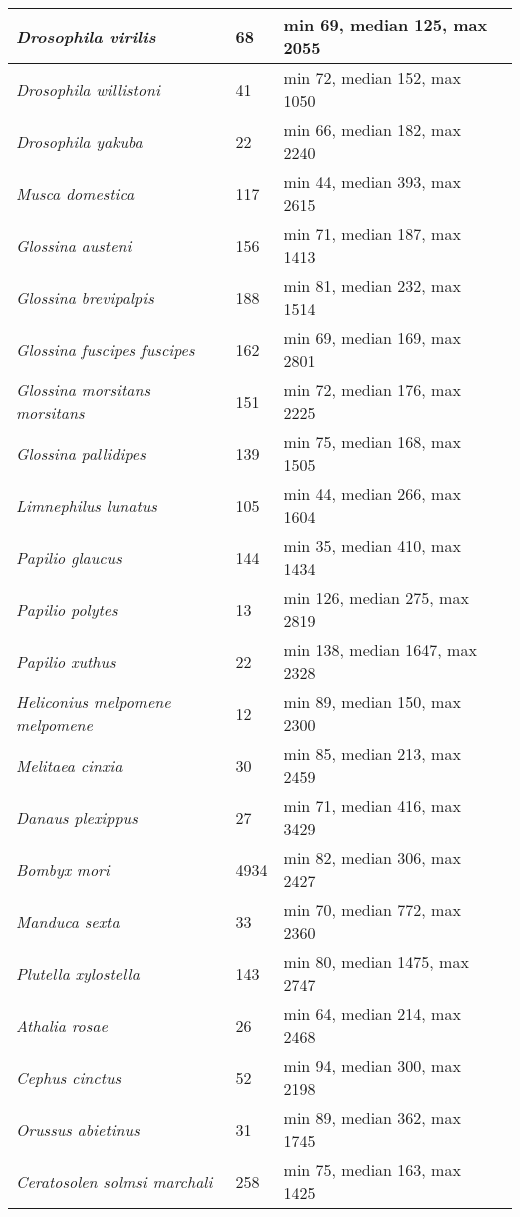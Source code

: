 {\begin{longtable}{| L{4cm} | L{2cm}  | L{5cm} | L{4cm} |}
\textit{Drosophila virilis} & 68 & min 69, median 125, max 2055 & \\ \hline
\textit{Drosophila willistoni} & 41 & min 72, median 152, max 1050 & \\ \hline
\textit{Drosophila yakuba} & 22 & min 66, median 182, max 2240 & \\ \hline
\textit{Musca domestica} & 117 & min 44, median 393, max 2615 & \\ \hline
\textit{Glossina austeni} & 156 & min 71, median 187, max 1413 & \\ \hline
\textit{Glossina brevipalpis} & 188 & min 81, median 232, max 1514 & \\ \hline
\textit{Glossina fuscipes fuscipes} & 162 & min 69, median 169, max 2801 & \\ \hline
\textit{Glossina morsitans morsitans} & 151 & min 72, median 176, max 2225 & \\ \hline
\textit{Glossina pallidipes} & 139 & min 75, median 168, max 1505 & \\ \hline
\textit{Limnephilus lunatus} & 105 & min 44, median 266, max 1604 & \\ \hline
\textit{Papilio glaucus} & 144 & min 35, median 410, max 1434 & \\ \hline
\textit{Papilio polytes} & 13 & min 126, median 275, max 2819 & \\ \hline
\textit{Papilio xuthus} & 22 & min 138, median 1647, max 2328 & \\ \hline
\textit{Heliconius melpomene melpomene} & 12 & min 89, median 150, max 2300 & \\ \hline
\textit{Melitaea cinxia} & 30 & min 85, median 213, max 2459 & \\ \hline
\textit{Danaus plexippus} & 27 & min 71, median 416, max 3429 & \\ \hline
\textit{Bombyx mori} & 4934 & min 82, median 306, max 2427 & \\ \hline
\textit{Manduca sexta} & 33 & min 70, median 772, max 2360 & \\ \hline
\textit{Plutella xylostella} & 143 & min 80, median 1475, max 2747 & \\ \hline
\textit{Athalia rosae} & 26 & min 64, median 214, max 2468 & \\ \hline
\textit{Cephus cinctus} & 52 & min 94, median 300, max 2198 & \\ \hline
\textit{Orussus abietinus} & 31 & min 89, median 362, max 1745 & \\ \hline
\textit{Ceratosolen solmsi marchali} & 258 & min 75, median 163, max 1425 & \\ \hline

\end{longtable}}
